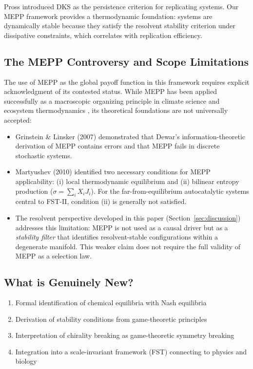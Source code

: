 \documentclass[12pt,a4paper]{article}
\theoremstyle{remark}
\begin{document}
Pross \citep{Pross2012} introduced DKS as the persistence criterion for replicating systems. Our MEPP framework provides a thermodynamic foundation: systems are dynamically stable because they satisfy the resolvent stability criterion under dissipative constraints, which correlates with replication efficiency.

\subsection{The MEPP Controversy and Scope Limitations}

The use of MEPP as the global payoff function in this framework requires explicit acknowledgment of its contested status. While MEPP has been applied successfully as a macroscopic organizing principle in climate science and ecosystem thermodynamics \citep{MEPP2006}, its theoretical foundations are not universally accepted:

\begin{itemize}
\item Grinstein \& Linsker (2007) demonstrated that Dewar's information-theoretic derivation of MEPP contains errors and that MEPP fails in discrete stochastic systems.
\item Martyushev (2010) identified two necessary conditions for MEPP applicability: (i) local thermodynamic equilibrium and (ii) bilinear entropy production ($\sigma = \sum_i X_i J_i$). For the far-from-equilibrium autocatalytic systems central to FST-II, condition (ii) is generally not satisfied.
\item The resolvent perspective developed in this paper (Section~\ref{sec:discussion}) addresses this limitation: MEPP is not used as a causal driver but as a \emph{stability filter} that identifies resolvent-stable configurations within a degenerate manifold. This weaker claim does not require the full validity of MEPP as a selection law.
\end{itemize}

\subsection{What is Genuinely New?}

\begin{enumerate}
    \item Formal identification of chemical equilibria with Nash equilibria
    \item Derivation of stability conditions from game-theoretic principles
    \item Interpretation of chirality breaking as game-theoretic symmetry breaking
    \item Integration into a scale-invariant framework (FST) connecting to physics and biology
\end{enumerate}
\end{document}
